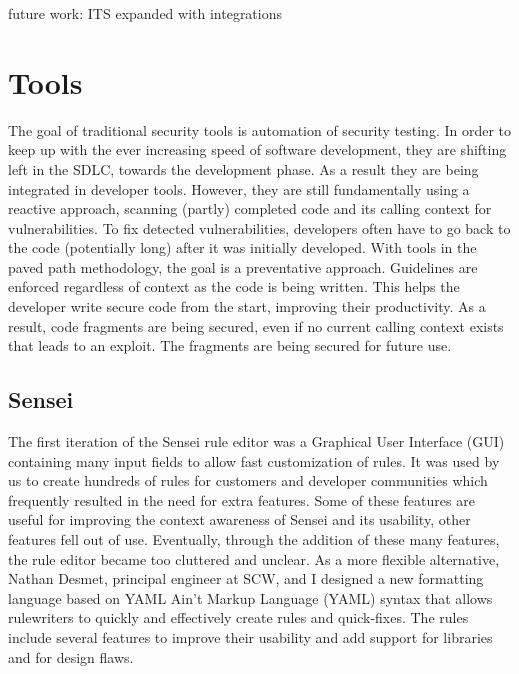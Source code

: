 future work: ITS expanded with integrations

\section{Tools}
The goal of traditional security tools is automation of security
testing. In order to keep up with the ever increasing speed of
software development, they are shifting left in the SDLC, towards
the development phase. As a result they are being integrated
in developer tools. However, they are still fundamentally using
a reactive approach, scanning (partly) completed code and its
calling context for vulnerabilities. To fix detected vulnerabilities,
developers often have to go back to the code (potentially long)
after it was initially developed. With tools in the paved path
methodology, the goal is a preventative approach. Guidelines are
enforced regardless of context as the code is being written. This
helps the developer write secure code from the start, improving
their productivity. As a result, code fragments are being secured,
even if no current calling context exists that leads to an exploit.
The fragments are being secured for future use.

\subsection{Sensei}
The first iteration of the Sensei rule editor was a Graphical User
Interface (GUI) containing many input fields to allow fast customization of rules. It was used by us to create hundreds of
rules for customers and developer communities which frequently
resulted in the need for extra features. Some of these features
are useful for improving the context awareness of Sensei and its
usability, other features fell out of use. Eventually, through the
addition of these many features, the rule editor became too cluttered and unclear.
As a more flexible alternative, Nathan Desmet, principal engineer
at SCW, and I designed a new formatting language based on
YAML Ain’t Markup Language (YAML) syntax that allows rulewriters to quickly and effectively create rules and quick-fixes. The
rules include several features to improve their usability and add
support for libraries and for design flaws.

